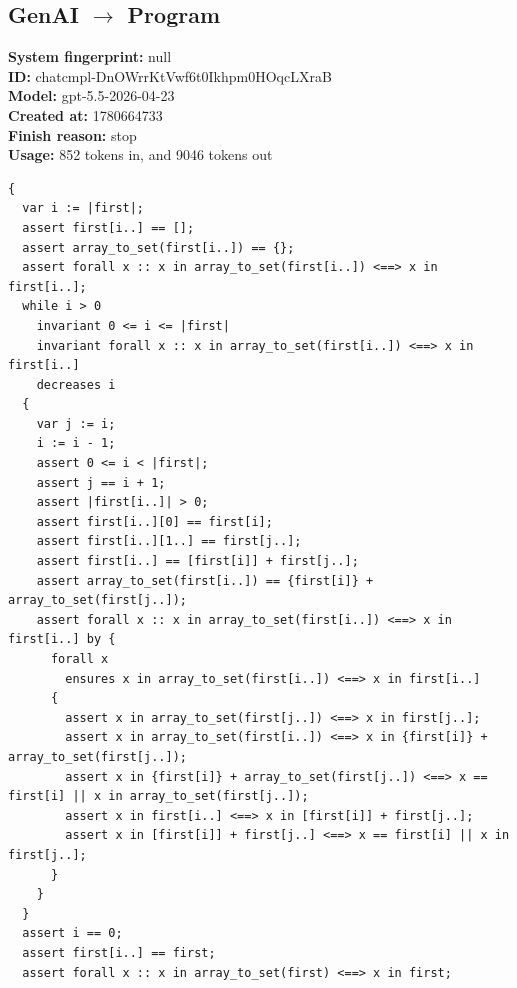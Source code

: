 \documentclass{article}
\begin{document}
\subsection*{GenAI $\rightarrow$ Program}
\textbf{System fingerprint: }null
\\\textbf{ID: }chatcmpl-DnOWrrKtVwf6t0Ikhpm0HOqcLXraB
\\\textbf{Model: }gpt-5.5-2026-04-23
\\\textbf{Created at: }1780664733
\\\textbf{Finish reason: }stop
\\\textbf{Usage: }852 tokens in, and 9046 tokens out
\begin{lstlisting}
{
  var i := |first|;
  assert first[i..] == [];
  assert array_to_set(first[i..]) == {};
  assert forall x :: x in array_to_set(first[i..]) <==> x in first[i..];
  while i > 0
    invariant 0 <= i <= |first|
    invariant forall x :: x in array_to_set(first[i..]) <==> x in first[i..]
    decreases i
  {
    var j := i;
    i := i - 1;
    assert 0 <= i < |first|;
    assert j == i + 1;
    assert |first[i..]| > 0;
    assert first[i..][0] == first[i];
    assert first[i..][1..] == first[j..];
    assert first[i..] == [first[i]] + first[j..];
    assert array_to_set(first[i..]) == {first[i]} + array_to_set(first[j..]);
    assert forall x :: x in array_to_set(first[i..]) <==> x in first[i..] by {
      forall x
        ensures x in array_to_set(first[i..]) <==> x in first[i..]
      {
        assert x in array_to_set(first[j..]) <==> x in first[j..];
        assert x in array_to_set(first[i..]) <==> x in {first[i]} + array_to_set(first[j..]);
        assert x in {first[i]} + array_to_set(first[j..]) <==> x == first[i] || x in array_to_set(first[j..]);
        assert x in first[i..] <==> x in [first[i]] + first[j..];
        assert x in [first[i]] + first[j..] <==> x == first[i] || x in first[j..];
      }
    }
  }
  assert i == 0;
  assert first[i..] == first;
  assert forall x :: x in array_to_set(first) <==> x in first;


\end{lstlisting}
\end{document}
